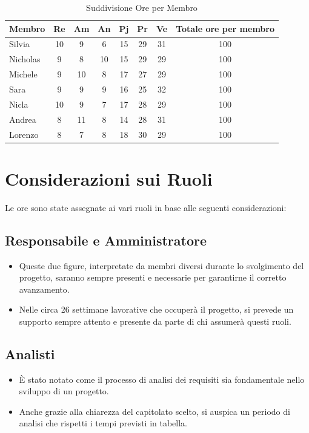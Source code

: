 \documentclass[11pt]{article}
\begin{document}
\begin{table}[h!]
\centering
\begin{tabular}{|l|c|c|c|c|c|c|c|}
\hline
    \textbf{Membro} &  \textbf{Re} & \textbf{Am} & \textbf{An} & \textbf{Pj} & \textbf{Pr} & \textbf{Ve} & \textbf{Totale ore per membro} \\
\hline
    Silvia & 10 & 9 & 6 & 15 & 29 & 31 & 100 \\ 
\hline
    Nicholas & 9 & 8 & 10 & 15 & 29 & 29 & 100 \\
\hline
    Michele & 9 & 10 & 8 & 17 & 27 & 29 & 100 \\ 
\hline
    Sara & 9 & 9 & 9 & 16 & 25 & 32 & 100 \\ 
\hline
    Nicla & 10 & 9 & 7 & 17 & 28 & 29 & 100 \\
\hline
    Andrea & 8 & 11 & 8 & 14 & 28 & 31 & 100 \\
\hline
    Lorenzo & 8 & 7 & 8 & 18 & 30 & 29 & 100 \\ 
\hline
\end{tabular}
\caption{Suddivisione Ore per Membro}
\label{table:1}
\end{table}


\section{Considerazioni sui Ruoli}
Le ore sono state assegnate ai vari ruoli in base alle seguenti considerazioni:

\subsection{Responsabile e Amministratore}
    \begin{itemize}
        \item Queste due figure, interpretate da membri diversi durante lo svolgimento del progetto, saranno sempre presenti e necessarie per garantirne il corretto avanzamento. 
        \item Nelle circa 26 settimane lavorative che occuperà  il progetto, si prevede un supporto sempre attento e presente da parte di chi assumerà questi ruoli.
    \end{itemize}
\subsection{Analisti}
    \begin{itemize}
        \item È stato notato come il processo di analisi dei requisiti sia fondamentale nello sviluppo di un progetto.
        \item Anche grazie alla chiarezza del capitolato scelto, si auspica un periodo di analisi che rispetti i tempi previsti in tabella.
    \end{itemize}
\end{document}
